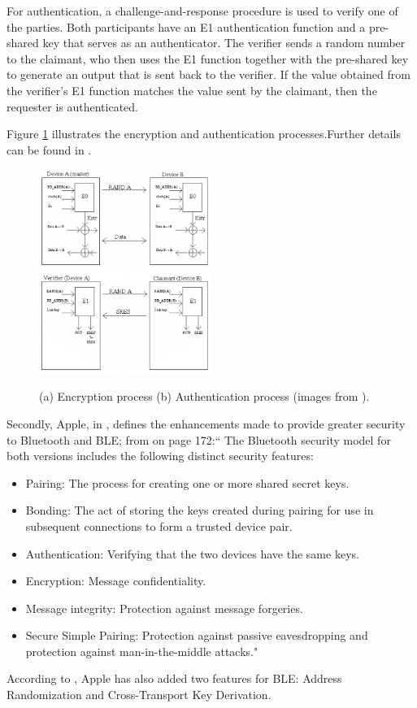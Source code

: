 \documentclass[english]{article}
\begin{document}
For authentication, a challenge-and-response procedure is used to verify one of the parties. Both participants have an E1 authentication function and a pre-shared key that serves as an authenticator. The verifier sends a random number to the claimant, who then uses the E1 function together with the pre-shared key to generate an output that is sent back to the verifier. If the value obtained from the verifier's E1 function matches the value sent by the claimant, then the requester is authenticated.

Figure \ref{blusec} illustrates the encryption and authentication processes.Further details can be found in \cite{1200664}.
\begin{figure}[]
	\centering
	\includegraphics[width=0.5\textwidth]{images/enc.png}\hfill 
	\includegraphics[width=0.5\textwidth]{images/auth.png}
	\caption{(a) Encryption process \quad (b) Authentication process (images from \cite{vainio2000bluetooth}).}
	\label{blusec}
\end{figure}

Secondly, Apple, in \cite{aps}, defines the enhancements made to provide greater security to Bluetooth and BLE; from \cite{aps} on page 172:`` The Bluetooth security model for both versions includes the following distinct security features:
\begin{itemize}
  \item Pairing: The process for creating one or more shared secret keys.
  \item Bonding: The act of storing the keys created during pairing for use in subsequent connections to form a trusted device pair.
  \item Authentication: Verifying that the two devices have the same keys.
  \item Encryption: Message confidentiality.
  \item Message integrity: Protection against message forgeries.
  \item Secure Simple Pairing: Protection against passive eavesdropping and protection against
  man-in-the-middle attacks."
\end{itemize}
According to \cite{aps}, Apple has also added two features for BLE: Address Randomization and Cross-Transport Key Derivation.
\end{document}
